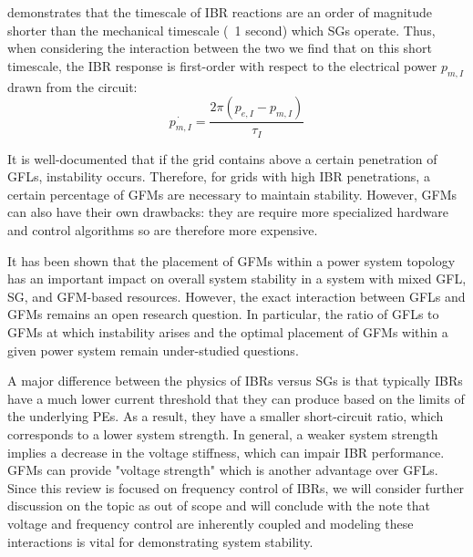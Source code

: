 demonstrates that the timescale of IBR reactions are an order of magnitude
shorter than the mechanical timescale (~1 second) which SGs operate.
Thus, when considering the interaction between the two we find that 
on this short timescale, the IBR response is first-order with respect to the
electrical power $p_{m,I}$ drawn from the circuit:
\begin{equation}
  \dot{p_{m,I}} = \frac{2 \pi (p_{e,I} - p_{m,I})}{\tau_I}
\end{equation}

It is well-documented that if the grid contains above a certain penetration
of GFLs, instability occurs. Therefore, for grids with high
IBR penetrations, a certain percentage of GFMs are necessary to maintain
stability. However, GFMs can also have their own drawbacks: they are
require more specialized hardware and control algorithms so are
therefore more expensive.

It has been shown that the placement of GFMs within a power system
topology has an important impact on overall system stability in a 
system with mixed GFL, SG, and GFM-based resources. However,
the exact interaction between GFLs and GFMs remains an open research
question. In particular, the ratio of GFLs to GFMs at which instability
arises and the optimal placement of GFMs within a given power system
remain under-studied questions.

A major difference between the physics of IBRs versus SGs is that
typically IBRs have a much lower current threshold that they
can produce based on the limits of the underlying PEs. As a result,
they have a smaller short-circuit ratio, which corresponds to 
a lower system strength. In general, a weaker system strength
implies a decrease in the voltage stiffness, which can impair
IBR performance. GFMs can provide "voltage strength" which is another
advantage over GFLs. Since this review is focused on frequency
control of IBRs, we will consider further discussion on the topic
as out of scope and will conclude with the note that voltage and
frequency control are inherently coupled and modeling these 
interactions is vital for demonstrating system stability.
